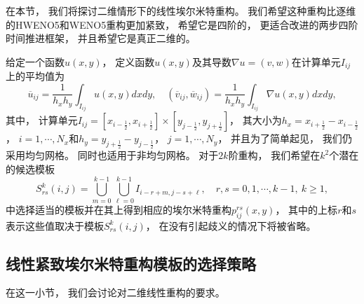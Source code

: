 在本节，
我们将探讨二维情形下的线性埃尔米特重构。
我们希望这种重构比逐维的HWENO5和WENO5重构更加紧致，
希望它是四阶的，
更适合改进的两步四阶时间推进框架，
并且希望它是真正二维的。

给定一个函数$u(x,y)$，
定义函数$u(x,y)$及其导数$\nabla u = (v, w)$在计算单元$I_{ij}$上的平均值为
\begin{equation}
  {\overline{u}}_{ij} = \frac {1}{h_xh_y} \int_{I_{ij}} u(x,y)dx dy, \quad
  \left({\overline{v}}_{ij},{\overline{w}}_{ij}\right) = \frac {1}{h_xh_y} \int_{I_{ij}} \nabla u(x,y)dx dy,
\end{equation}
其中，
计算单元$I_{ij}=[x_{i-\frac 12},x_{i+\frac 12}]\times[y_{j-\frac 12},y_{j+\frac 12}]$，
其大小为$h_x=x_{i+\frac 12}-x_{i-\frac 12}$，
$i=1,\cdots, N_x$和$h_y=y_{j+\frac 12}-y_{j-\frac 12}$，
$j=1,\cdots, N_y$，
并且为了简单起见，
我们仍采用均匀网格。
同时也适用于非均匀网格。
对于$2k$阶重构，
我们希望在$k^2$个潜在的候选模板
\begin{equation}
  S^k_{rs}(i,j)=\bigcup_{m=0}^{k-1} \bigcup_{\ell=0}^{k-1} I_{i-r+m,j-s+\ell}, \quad
  r,s=0,1,\cdots,k-1,~k \ge 1,
\end{equation}
中选择适当的模板并在其上得到相应的埃尔米特重构$p^{rs}_{ij}(x,y)$，
其中的上标$r$和$s$表示这些值取决于模板$S^k_{rs}(i,j)$，
在没有引起歧义的情况下将被省略。

\subsection{线性紧致埃尔米特重构模板的选择策略}
\label{sec:2D-linear-rec-aim}

在这一小节，
我们会讨论对二维线性重构的要求。

